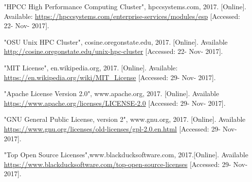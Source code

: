 \documentclass[10pt,draftclsnofoot,onecolumn,journal,compsoc]{IEEEtran}
\begin{document}
\begin{thebibliography}{9}
 "HPCC High Performance Computing Cluster", hpccsystems.com, 2017. [Online]. Available: \url{https://hpccsystems.com/enterprise-services/modules/esp} [Accessed: 22- Nov- 2017].

 "OSU Unix HPC Cluster", cosine.oregonstate.edu, 2017. [Online]. Available \url{http://cosine.oregonstate.edu/unix-hpc-cluster} [Accessed: 22- Nov- 2017].

 "MIT License", en.wikipedia.org, 2017. [Online]. Available: \url{https://en.wikipedia.org/wiki/MIT_License} [Accessed: 29- Nov- 2017].

 "Apache License Version 2.0", www.apache.org, 2017. [Online]. Available \url{https://www.apache.org/licenses/LICENSE-2.0} [Accessed: 29- Nov- 2017].

 "GNU General Public License, version 2", www.gnu.org, 2017. [Online]. Available \url{https://www.gnu.org/licenses/old-licenses/gpl-2.0.en.html} [Accessed: 29- Nov- 2017].

 "Top Open Source Licenses",www.blackducksoftware.com, 2017.[Online]. Available \url{https://www.blackducksoftware.com/top-open-source-licenses} [Accessed: 29- Nov- 2017].
\end{thebibliography}
\end{document}
